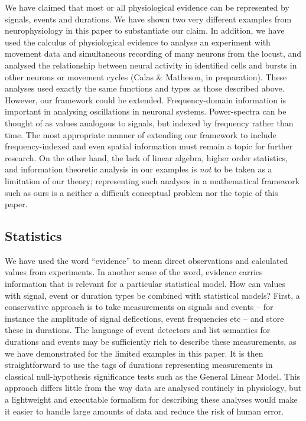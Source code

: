 We have claimed that most or all physiological evidence can be
represented by signals, events and durations. We have shown two very
different examples from neurophysiology in this paper to substantiate
our claim. In addition, we have used the calculus of physiological
evidence to analyse an experiment with movement data and simultaneous
recording of many neurons from the locust, and analysed the
relationship between neural activity in identified cells and bursts in
other neurons or movement cycles (Calas \& Matheson, in
preparation). These analyses used exactly the same functions and types
as those described above. However, our framework could be
extended. Frequency-domain information is important in analysing
oscillations in neuronal systems. Power-spectra can be thought of as
values analogous to signals, but indexed by frequency rather than
time. The most appropriate manner of extending our framework to
include frequency-indexed and even spatial information must remain a
topic for further research. On the other hand, the lack of linear
algebra, higher order statistics, and information theoretic analysis
in our examples is \emph{not} to be taken as a limitation of our
theory; representing such analyses in a mathematical framework such as
ours is a neither a difficult conceptual problem nor the topic of this
paper.

\subsection*{Statistics}

We have used the word ``evidence'' to mean direct observations and
calculated values from experiments. In another sense of the word,
evidence carries information that is relevant for a particular
statistical model. How can values with signal, event or duration types
be combined with statistical models? First, a conservative approach is
to take measurements on signals and events -- for instance the
amplitude of signal deflections, event frequencies etc -- and store
these in durations. The language of event detectors and list semantics
for durations and events may be sufficiently rich to describe these
measurements, as we have demonstrated for the limited examples in this
paper. It is then straightforward to use the tags of durations
representing measurements in classical null-hypothesis significance
tests such as the General Linear Model. This approach differs little
from the way data are analysed routinely in physiology, but a
lightweight and executable formalism for describing these analyses
would make it easier to handle large amounts of data and reduce the
risk of human error.


